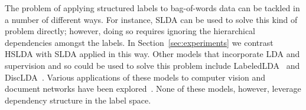

The problem of applying structured labels to bag-of-words data can be tackled in a number of different ways.  For instance,  SLDA can be used to solve this kind of problem directly; however, doing so requires ignoring the hierarchical
dependencies amongst the labels. In Section~\ref{sec:experiments} we contrast
HSLDA with SLDA applied in this way. 
Other models that incorporate LDA and supervision and so could be used to solve this problem include
LabeledLDA~\cite{Ramage2009} and DiscLDA~\cite{DiscLDA}.  Various applications of these models to 
computer vision and document networks have been explored~\cite{wangbleifeifei08,RelationalLDA}.
None of these models, however, leverage dependency structure in the label space.





